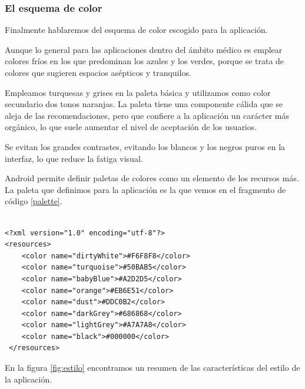 \subsubsection{El esquema de color}
Finalmente hablaremos del esquema de color escogido para la aplicación.\par
Aunque lo general para las aplicaciones dentro del ámbito médico es emplear colores fríos en los que predominan los azules y los verdes, porque se trata de colores que sugieren espacios asépticos y  tranquilos.\par
Empleamos turquesas y grises en la paleta básica y utilizamos como color secundario dos tonos naranjas. La paleta tiene una componente cálida que se aleja de las recomendaciones, pero que confiere a la aplicación un carácter más orgánico, lo que suele aumentar el nivel de aceptación de los usuarios.\par
Se evitan los grandes contrastes, evitando los blancos y los negros puros en la interfaz, lo que reduce la fatiga visual.\medskip\par
Android permite definir paletas de colores como un elemento de los recursos más. La paleta que definimos para la aplicación es la que vemos en el fragmento de código \ref{palette}.

\lstset{escapechar=@,style=dicom}
\begin{lstlisting}[label=palette,caption=Esquema de color]

<?xml version="1.0" encoding="utf-8"?>
<resources>
    <color name="dirtyWhite">#F6F8F8</color>
    <color name="turquoise">#50BAB5</color>
    <color name="babyBlue">#A2D2D5</color>
    <color name="orange">#EB6E51</color>
    <color name="dust">#DDC0B2</color>
    <color name="darkGrey">#686868</color>
    <color name="lightGrey">#A7A7A8</color> 
    <color name="black">#000000</color>
 </resources>

\end{lstlisting}
En la figura \ref{fig:estilo} encontramos un resumen de las características del estilo de la aplicación.\par


